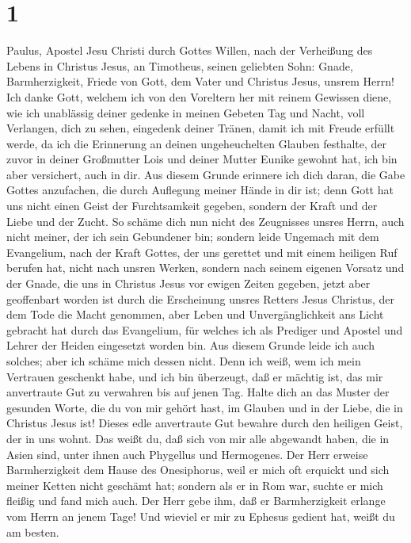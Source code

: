 \hypertarget{section}{%
\section{1}\label{section}}

 Paulus, Apostel Jesu Christi durch Gottes Willen, nach
der Verheißung des Lebens in Christus Jesus,  an
Timotheus, seinen geliebten Sohn: Gnade, Barmherzigkeit, Friede von
Gott, dem Vater und Christus Jesus, unsrem Herrn!  Ich
danke Gott, welchem ich von den Voreltern her mit reinem Gewissen diene,
wie ich unablässig deiner gedenke in meinen Gebeten Tag und Nacht,
 voll Verlangen, dich zu sehen, eingedenk deiner Tränen,
damit ich mit Freude erfüllt werde,  da ich die Erinnerung
an deinen ungeheuchelten Glauben festhalte, der zuvor in deiner
Großmutter Lois und deiner Mutter Eunike gewohnt hat, ich bin aber
versichert, auch in dir.  Aus diesem Grunde erinnere ich
dich daran, die Gabe Gottes anzufachen, die durch Auflegung meiner Hände
in dir ist;  denn Gott hat uns nicht einen Geist der
Furchtsamkeit gegeben, sondern der Kraft und der Liebe und der Zucht.
 So schäme dich nun nicht des Zeugnisses unsres Herrn,
auch nicht meiner, der ich sein Gebundener bin; sondern leide Ungemach
mit dem Evangelium, nach der Kraft Gottes,  der uns
gerettet und mit einem heiligen Ruf berufen hat, nicht nach unsren
Werken, sondern nach seinem eigenen Vorsatz und der Gnade, die uns in
Christus Jesus vor ewigen Zeiten gegeben,  jetzt aber
geoffenbart worden ist durch die Erscheinung unsres Retters Jesus
Christus, der dem Tode die Macht genommen, aber Leben und
Unvergänglichkeit ans Licht gebracht hat durch das Evangelium,
 für welches ich als Prediger und Apostel und Lehrer der
Heiden eingesetzt worden bin.  Aus diesem Grunde leide
ich auch solches; aber ich schäme mich dessen nicht. Denn ich weiß, wem
ich mein Vertrauen geschenkt habe, und ich bin überzeugt, daß er mächtig
ist, das mir anvertraute Gut zu verwahren bis auf jenen Tag.
 Halte dich an das Muster der gesunden Worte, die du von
mir gehört hast, im Glauben und in der Liebe, die in Christus Jesus ist!
 Dieses edle anvertraute Gut bewahre durch den heiligen
Geist, der in uns wohnt.  Das weißt du, daß sich von mir
alle abgewandt haben, die in Asien sind, unter ihnen auch Phygellus und
Hermogenes.  Der Herr erweise Barmherzigkeit dem Hause
des Onesiphorus, weil er mich oft erquickt und sich meiner Ketten nicht
geschämt hat;  sondern als er in Rom war, suchte er mich
fleißig und fand mich auch.  Der Herr gebe ihm, daß er
Barmherzigkeit erlange vom Herrn an jenem Tage! Und wieviel er mir zu
Ephesus gedient hat, weißt du am besten.

